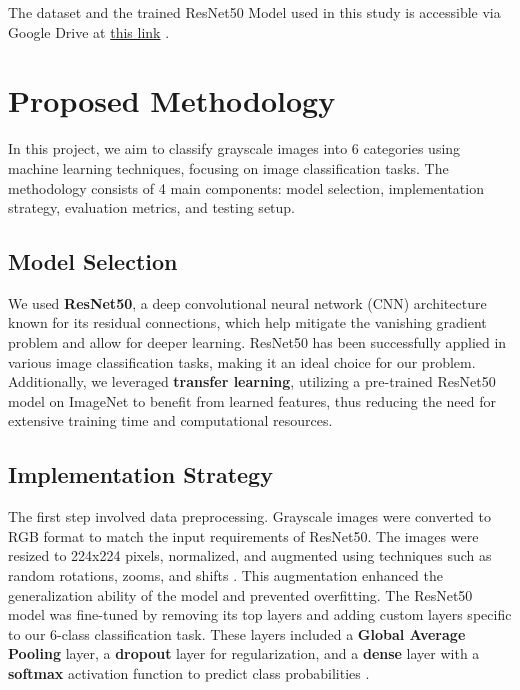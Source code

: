\documentclass[journal]{IEEEtran}
\begin{document}
The dataset and the trained ResNet50 Model used in this study is accessible via Google Drive at \href{https://drive.google.com/drive/folders/1DMyWrGlT2p1CiQlM6K2aXYlUdI-efoyM?usp=sharing}{this link} \cite{google-drive}.



\section{Proposed Methodology}
In this project, we aim to classify grayscale images into 6 categories using machine learning techniques, focusing on image classification tasks. The methodology consists of 4 main components: model selection, implementation strategy, evaluation metrics, and testing setup.

\subsection{Model Selection}
We used \textbf{ResNet50}, a deep convolutional neural network (CNN) architecture known for its residual connections, which help mitigate the vanishing gradient problem and allow for deeper learning. ResNet50 has been successfully applied in various image classification tasks, making it an ideal choice for our problem. Additionally, we leveraged \textbf{transfer learning}, utilizing a pre-trained ResNet50 model on ImageNet to benefit from learned features, thus reducing the need for extensive training time and computational resources.

\subsection{Implementation Strategy}
The first step involved data preprocessing. Grayscale images were converted to RGB format to match the input requirements of ResNet50. The images were resized to 224x224 pixels, normalized, and augmented using techniques such as random rotations, zooms, and shifts \cite{prof-candemir}. This augmentation enhanced the generalization ability of the model and prevented overfitting. The ResNet50 model was fine-tuned by removing its top layers and adding custom layers specific to our 6-class classification task. These layers included a \textbf{Global Average Pooling} layer, a \textbf{dropout} layer for regularization, and a \textbf{dense} layer with a \textbf{softmax} activation function to predict class probabilities \cite{prof-koc} \cite{prof-candemir} \cite{prof-karahoda}. 
\end{document}

